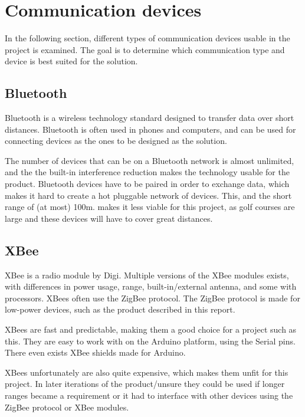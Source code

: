 \section{Communication devices}
In the following section, different types of communication devices usable in the project is examined. The goal is to determine which communication type and device is best suited for the solution.

\subsection{Bluetooth}
Bluetooth is a wireless technology standard designed to transfer data over short distances. Bluetooth is often used in phones and computers, and can be used for connecting devices as the ones to be designed as the solution. 

The number of devices that can be on a Bluetooth network is almost unlimited, and the the built-in interference reduction makes the technology usable for the product\cite{bluetoothbasics}.
Bluetooth devices have to be paired in order to exchange data, which makes it hard to create a hot pluggable network of devices. This, and the short range of (at most) 100m\cite{bluetoothbasics}. makes it less viable for this project, as golf courses are large and these devices will have to cover great distances.

\subsection{XBee}
XBee is a radio module by Digi. Multiple versions of the XBee modules exists, with differences in power usage, range, built-in/external antenna, and some with processors\cite{sparkfunXbeeGuide}.
XBees often use the ZigBee protocol. The ZigBee protocol is made for low-power devices, such as the product described in this report\cite{zigbee}.

XBees are fast and predictable, making them a good choice for a project such as this. They are easy to work with on the Arduino platform, using the Serial pins. There even exists XBee shields made for Arduino.

XBees unfortunately are also quite expensive, which makes them unfit for this project. In later iterations of the product/unsure   they could be used if longer ranges became a requirement or it had to interface with other devices using the ZigBee protocol or XBee modules.

